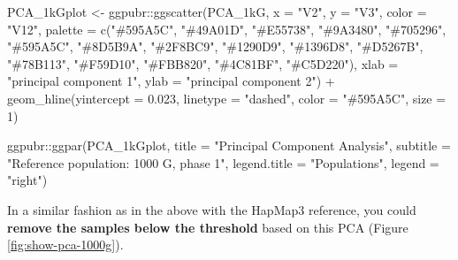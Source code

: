 \documentclass[
]{book}
\newenvironment{Shaded}{\begin{snugshade}}{\end{snugshade}}
\newcommand{\AttributeTok}[1]{\textcolor[rgb]{0.77,0.63,0.00}{#1}}
\newcommand{\DecValTok}[1]{\textcolor[rgb]{0.00,0.00,0.81}{#1}}
\newcommand{\FloatTok}[1]{\textcolor[rgb]{0.00,0.00,0.81}{#1}}
\newcommand{\FunctionTok}[1]{\textcolor[rgb]{0.00,0.00,0.00}{#1}}
\newcommand{\NormalTok}[1]{#1}
\newcommand{\OtherTok}[1]{\textcolor[rgb]{0.56,0.35,0.01}{#1}}
\newcommand{\SpecialCharTok}[1]{\textcolor[rgb]{0.00,0.00,0.00}{#1}}
\newcommand{\StringTok}[1]{\textcolor[rgb]{0.31,0.60,0.02}{#1}}
\begin{document}
\begin{Shaded}
\begin{Highlighting}[]
\NormalTok{PCA\_1kGplot }\OtherTok{\textless{}{-}}\NormalTok{ ggpubr}\SpecialCharTok{::}\FunctionTok{ggscatter}\NormalTok{(PCA\_1kG, }\AttributeTok{x =} \StringTok{"V2"}\NormalTok{, }\AttributeTok{y =} \StringTok{"V3"}\NormalTok{,}
                                 \AttributeTok{color =} \StringTok{"V12"}\NormalTok{,}
                                 \AttributeTok{palette =} \FunctionTok{c}\NormalTok{(}\StringTok{"\#595A5C"}\NormalTok{, }\StringTok{"\#49A01D"}\NormalTok{, }\StringTok{"\#E55738"}\NormalTok{, }\StringTok{"\#9A3480"}\NormalTok{, }\StringTok{"\#705296"}\NormalTok{, }
                                             \StringTok{"\#595A5C"}\NormalTok{, }\StringTok{"\#8D5B9A"}\NormalTok{, }\StringTok{"\#2F8BC9"}\NormalTok{, }\StringTok{"\#1290D9"}\NormalTok{, }\StringTok{"\#1396D8"}\NormalTok{, }
                                             \StringTok{"\#D5267B"}\NormalTok{, }\StringTok{"\#78B113"}\NormalTok{, }\StringTok{"\#F59D10"}\NormalTok{, }\StringTok{"\#FBB820"}\NormalTok{, }\StringTok{"\#4C81BF"}\NormalTok{, }\StringTok{"\#C5D220"}\NormalTok{),}
                                 \AttributeTok{xlab =} \StringTok{"principal component 1"}\NormalTok{, }\AttributeTok{ylab =} \StringTok{"principal component 2"}\NormalTok{) }\SpecialCharTok{+}
  \FunctionTok{geom\_hline}\NormalTok{(}\AttributeTok{yintercept =} \FloatTok{0.023}\NormalTok{, }\AttributeTok{linetype =} \StringTok{"dashed"}\NormalTok{,}
                \AttributeTok{color =} \StringTok{"\#595A5C"}\NormalTok{, }\AttributeTok{size =} \DecValTok{1}\NormalTok{)}

\NormalTok{  ggpubr}\SpecialCharTok{::}\FunctionTok{ggpar}\NormalTok{(PCA\_1kGplot,}
                \AttributeTok{title =} \StringTok{"Principal Component Analysis"}\NormalTok{,}
                \AttributeTok{subtitle =} \StringTok{"Reference population: 1000 G, phase 1"}\NormalTok{,}
                \AttributeTok{legend.title =} \StringTok{"Populations"}\NormalTok{, }\AttributeTok{legend =} \StringTok{"right"}\NormalTok{)}
\end{Highlighting}
\end{Shaded}

In a similar fashion as in the above with the HapMap3 reference, you could \textbf{remove the samples below the threshold} based on this PCA (Figure \ref{fig:show-pca-1000g}).
\end{document}
